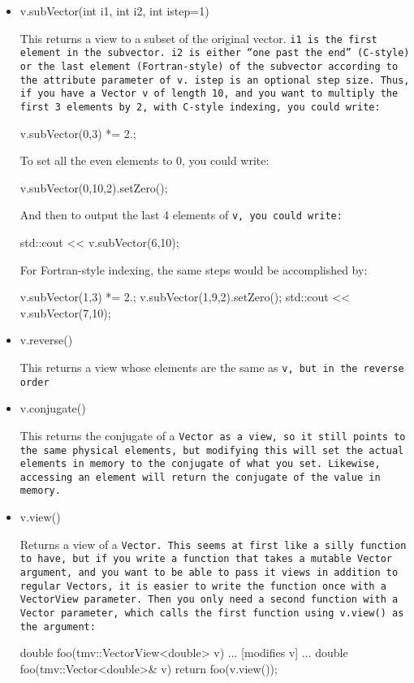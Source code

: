 \begin{itemize}
\item
\begin{tmvcode}
v.subVector(int i1, int i2, int istep=1)
\end{tmvcode}
This returns a view to a subset of the original vector.
\tt{i1} is the first element in the subvector.
\tt{i2} is either ``one past the end'' (C-style) or the last element
(Fortran-style) of the subvector according to the attribute parameter of \tt{v}.
\tt{istep} is an optional step size.
Thus, if you have a \tt{Vector v} of length 10, and you want to
multiply the first 3 elements by 2, with C-style indexing, you could write:
\begin{tmvcode}
v.subVector(0,3) *= 2.;
\end{tmvcode}
To set all the even elements to 0, you could write:
\begin{tmvcode}
v.subVector(0,10,2).setZero();
\end{tmvcode}
And then to output the last 4 elements of \tt{v}, you could write:
\begin{tmvcode}
std::cout << v.subVector(6,10);
\end{tmvcode}

For Fortran-style indexing, the same steps would be accomplished by:
\begin{tmvcode}
v.subVector(1,3) *= 2.;
v.subVector(1,9,2).setZero();
std::cout << v.subVector(7,10);
\end{tmvcode}

\item
\begin{tmvcode}
v.reverse()
\end{tmvcode}
This returns a view whose elements are the same as \tt{v},
but in the reverse order

\item
\begin{tmvcode}
v.conjugate()
\end{tmvcode}
This returns the conjugate of a \tt{Vector} as a view, so it still points
to the same physical elements, but modifying this will set the 
actual elements in memory to the conjugate of what you set.  Likewise,
accessing an element will return the conjugate of the value in memory.

\item
\begin{tmvcode}
v.view()
\end{tmvcode}
Returns a view of a \tt{Vector}.  This seems at first like a silly function to have, but
if you write a function that takes a mutable \tt{Vector} argument, and you want to
be able to pass it views in addition to regular \tt{Vector}s, it is easier to write the 
function once with a \tt{VectorView} parameter.  Then you only need a second 
function with a \tt{Vector} parameter, which calls the first function
using \tt{v.view()} as the argument:
\begin{tmvcode}
double foo(tmv::VectorView<double> v)
{ ... [modifies v] ... }
double foo(tmv::Vector<double>& v)
{ return foo(v.view()); }
\end{tmvcode}


\end{itemize}
